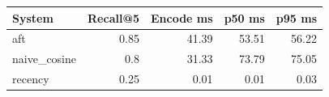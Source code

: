 \begin{tabular}{lrrrr}
\toprule
\textbf{System} & \textbf{Recall@5} & \textbf{Encode ms} & \textbf{p50 ms} & \textbf{p95 ms} \\
\midrule
aft & 0.85 & 41.39 & 53.51 & 56.22 \\
naive\_cosine & 0.8 & 31.33 & 73.79 & 75.05 \\
recency & 0.25 & 0.01 & 0.01 & 0.03 \\
\bottomrule
\end{tabular}
